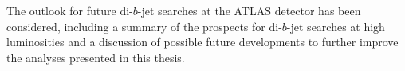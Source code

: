The outlook for future di-$b$-jet searches at the ATLAS detector has been considered,
including a summary of the prospects for di-$b$-jet searches at high luminosities
and a discussion of possible future developments to further improve the analyses presented in this thesis.


